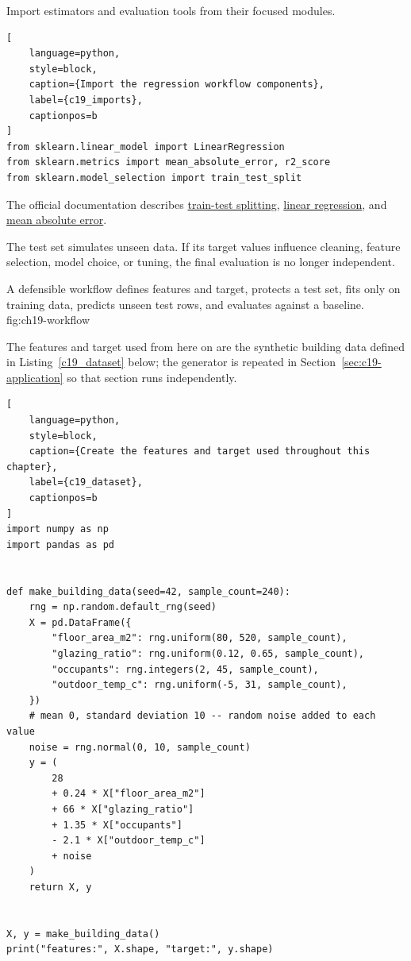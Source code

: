 Import estimators and evaluation tools from their focused modules.

\begin{lstlisting}[
    language=python,
    style=block,
    caption={Import the regression workflow components},
    label={c19_imports},
    captionpos=b
]
from sklearn.linear_model import LinearRegression
from sklearn.metrics import mean_absolute_error, r2_score
from sklearn.model_selection import train_test_split
\end{lstlisting}

The official documentation describes
\href{https://scikit-learn.org/stable/modules/generated/sklearn.model_selection.train_test_split.html}{train-test splitting},
\href{https://scikit-learn.org/stable/modules/generated/sklearn.linear_model.LinearRegression.html}{linear regression},
and
\href{https://scikit-learn.org/stable/modules/generated/sklearn.metrics.mean_absolute_error.html}{mean absolute error}.


The test set simulates unseen data. If its target values influence cleaning,
feature selection, model choice, or tuning, the final evaluation is no longer
independent.

{A defensible workflow defines features and target, protects a test set, fits only on training data, predicts unseen test rows, and evaluates against a baseline.}
{fig:ch19-workflow}

The features and target used from here on are the synthetic building data
defined in Listing~\ref{c19_dataset} below; the generator is repeated in
Section~\ref{sec:c19-application} so that section runs independently.

\begin{lstlisting}[
    language=python,
    style=block,
    caption={Create the features and target used throughout this chapter},
    label={c19_dataset},
    captionpos=b
]
import numpy as np
import pandas as pd


def make_building_data(seed=42, sample_count=240):
    rng = np.random.default_rng(seed)
    X = pd.DataFrame({
        "floor_area_m2": rng.uniform(80, 520, sample_count),
        "glazing_ratio": rng.uniform(0.12, 0.65, sample_count),
        "occupants": rng.integers(2, 45, sample_count),
        "outdoor_temp_c": rng.uniform(-5, 31, sample_count),
    })
    # mean 0, standard deviation 10 -- random noise added to each value
    noise = rng.normal(0, 10, sample_count)
    y = (
        28
        + 0.24 * X["floor_area_m2"]
        + 66 * X["glazing_ratio"]
        + 1.35 * X["occupants"]
        - 2.1 * X["outdoor_temp_c"]
        + noise
    )
    return X, y


X, y = make_building_data()
print("features:", X.shape, "target:", y.shape)
\end{lstlisting}

